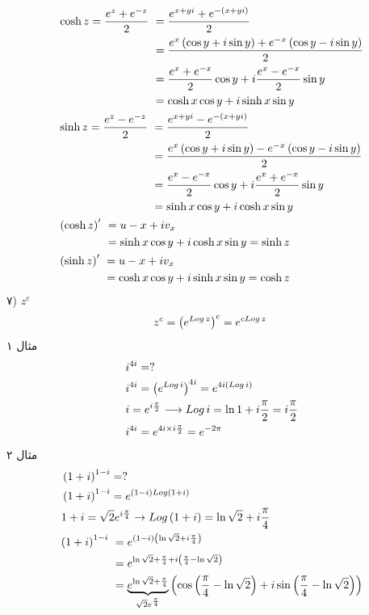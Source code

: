 \[\begin{aligned}
	&\ 
	\begin{aligned}
	\cosh z=\frac{e^z+e^{-z}}2 &\
	=\frac{e^{x+yi}+e^{-\pr{x+yi}}}2
	\\ &\
	=\frac{e^x\pr{\cos y+i\sin y}+e^{-x}\pr{\cos y-i\sin y}}2
	\\ &\
	=\frac{e^x+e^{-x}}2\cos y+i\frac{e^x-e^{-x}}2\sin y
	\\ &\
	=\cosh x\cos y+i\sinh x\sin y
	\end{aligned}
\\ &\
\begin{aligned}
	\sinh z=\frac{e^z-e^{-z}}2 &\
	=\frac{e^{x+yi}-e^{-\pr{x+yi}}}2
	\\ &\
	=\frac{e^x\pr{\cos y+i\sin y}-e^{-x}\pr{\cos y-i\sin y}}2
	\\ &\
	=\frac{e^x-e^{-x}}2\cos y+i\frac{e^x+e^{-x}}2\sin y
	\\ &\
	=\sinh x\cos y+i\cosh x\sin y
\end{aligned}
\\ &\
\begin{aligned}
	\pr{\cosh z}^\prime &\
	=u-x+iv_x
	\\ &\
	=\sinh x \cos y+i\cosh x\sin y=\sinh z
\end{aligned}
\\ &\
\begin{aligned}
	\pr{\sinh z}^\prime &\
	=u-x+iv_x
	\\ &\
	=\cosh x \cos y+i\sinh x\sin y=\cosh z
\end{aligned}
\end{aligned}\]
۷)
$z^c$
\[
z^c=\left(e^{Log\,z}\right)^c=e^{cLog\,z}
\]
مثال ۱
\[\begin{aligned}
	&\
	i^{4i}=?
	\\ &\
	i^{4i}=\left(e^{Log\,i}\right)^{4i}=e^{4i\left(Log\,i\right)}
	\\ &\
	i=e^{i\frac\pi2}\longrightarrow Log\,i=\ln 1+i\frac\pi2=i\frac\pi2
	\\ &\
	i^{4i}=e^{4i\times i\frac\pi2}=e^{-2\pi}
\end{aligned}\]
مثال ۲
\[\begin{aligned}
	&\ \left(1+i\right)^{1-i}=?
	\\ &\
	\left(1+i\right)^{1-i}=e^{\left(1-i\right)Log\left(1+i\right)}
	\\ &\
	1+i=\sqrt{2}e^{i\frac\pi4}\rightarrow Log\left(1+i\right)=\ln \sqrt2+i\frac\pi4
	\\ &\
	\begin{aligned}
			\left(1+i\right)^{1-i}&\ =e^{\left(1-i\right)\left(\ln\sqrt2+i\frac\pi4\right)}
			\\ &\
			=e^{\ln\sqrt2+\frac\pi4+i\left(\frac\pi4-\ln\sqrt2\right)}
			\\ &\
			=\underbrace{e^{\ln\sqrt2+\frac\pi4}}_{\sqrt2 e^{\frac\pi4}}\left(\cos\left(\frac\pi4-\ln\sqrt2\right)+i\sin\left(\frac\pi4-\ln\sqrt2\right)\right)
	\end{aligned}
\end{aligned}\]
